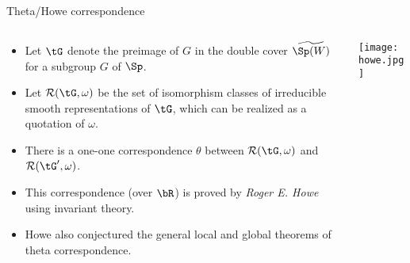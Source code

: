 \documentclass[final,hyperref={pdfpagelabels=false}]{beamer} %
\def\cR{{\mathcal{R}}}
\begin{document}
\begin{frame}
\begin{columns}[t]
\begin{column}{.48\linewidth}
    \begin{block}{Theta/Howe correspondence}
      \begin{columns}
        \begin{column}{0.7\textwidth}
      \begin{itemize}
        \item Let $\tG$ denote the preimage of $G$ in the double cover 
          $\widetilde{\Sp(W)}$ for a subgroup $G$ of $\Sp$.
        \item Let $\cR(\tG,\omega)$ be the set of isomorphism classes 
          of irreducible smooth representations of $\tG$,
          which can be realized as a quotation of $\omega$.
        \item There is a one-one correspondence $\theta$
          between $\cR(\tG,\omega)$ and $\cR(\tG',\omega)$.
        \item This correspondence (over $\bR$) is proved by {\em Roger E. Howe} 
          using invariant theory.
        \item Howe also conjectured the general local and global theorems of theta correspondence.
      \end{itemize}
    \end{column}
    \begin{column}{0.26\textwidth}
      \texttt{[image: howe.jpg]}
    \end{column}
  \end{columns}
\end{block}


\end{column}
\end{columns}
\end{frame}
\end{document}
